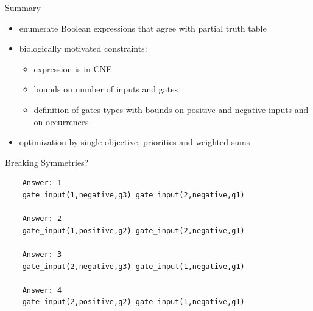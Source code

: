 \documentclass[10pt,dvipsnames]{beamer}
\begin{document}
\begin{frame}{Summary}
 \begin{itemize}
  \item enumerate Boolean expressions that agree with partial truth table
  \item biologically motivated constraints:
  \begin{itemize}
   \item expression is in CNF
   \item bounds on number of inputs and gates
   \item definition of gates types with bounds on positive and negative inputs and on occurrences   
  \end{itemize}
  \item optimization by single objective, priorities and weighted sums
  \end{itemize}
\end{frame}



\begin{frame}[fragile]{Breaking Symmetries?}
 \vfill
 \begin{verbatim}
    Answer: 1
    gate_input(1,negative,g3) gate_input(2,negative,g1)
    
    Answer: 2
    gate_input(1,positive,g2) gate_input(2,negative,g1)
    
    Answer: 3
    gate_input(2,negative,g3) gate_input(1,negative,g1)
    
    Answer: 4
    gate_input(2,positive,g2) gate_input(1,negative,g1)
 \end{verbatim}
\end{frame}
\end{document}
